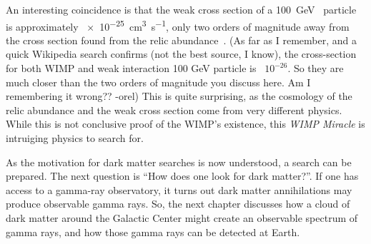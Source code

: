 An interesting coincidence is that the weak cross section of a \SI{100}{\GeV{}} particle is approximately \SI{e-25}{cm^3s^{-1}}, only two orders of magnitude away from the cross section found from the relic abundance~\cite{Jungman:1995df}.
{\color{red}(As far as I remember, and a quick Wikipedia search confirms (not the best source, I know), the cross-section for both WIMP and weak interaction 100 GeV particle is ~$10^{-26}$. So they are much closer than the two orders of magnitude you discuss here. Am I remembering it wrong?? -orel)}
This is quite surprising, as the cosmology of the relic abundance and the weak cross section come from very different physics.
While this is not conclusive proof of the WIMP's existence, this \textit{WIMP Miracle} is intruiging physics to search for.

As the motivation for dark matter searches is now understood, a search can be prepared.
The next question is ``How does one look for dark matter?''.
If one has access to a gamma-ray observatory, it turns out dark matter annihilations may produce observable gamma rays.
So, the next chapter discusses how a cloud of dark matter around the Galactic Center might create an observable spectrum of gamma rays, and how those gamma rays can be detected at Earth.


















